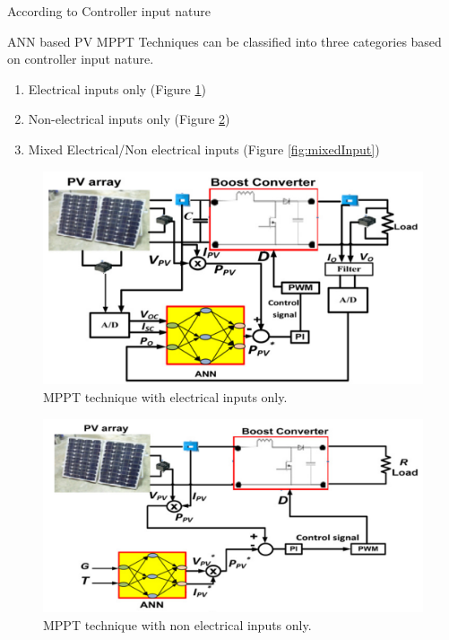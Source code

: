 \documentclass[10pt]{beamer}
\begin{document}
\begin{frame}[c, allowframebreaks]{According to Controller input nature}

ANN based PV MPPT Techniques can be classified into three categories based on controller input nature. 

\begin{enumerate}
	\item{Electrical inputs only (Figure \ref{fig:elecInput})}
    \item{Non-electrical inputs only (Figure \ref{fig:nonElecInput})}
    \item{Mixed Electrical/Non electrical inputs (Figure \ref{fig:mixedInput})}
\end{enumerate}

\framebreak 

\vspace{3.5cm}

\begin{figure}[b]
	\centering
	\centerline{\includegraphics[scale=0.2]{elecinput.png}}
    \caption{MPPT technique with electrical inputs only.}
    \label{fig:elecInput}
\end{figure}

\framebreak 

\begin{figure}
	\centering
    \centerline{\includegraphics[scale=0.2]{nonelecinput.png}}
    \caption{MPPT technique with non electrical inputs only.}
    \label{fig:nonElecInput}
\end{figure}


\end{frame}
\end{document}
